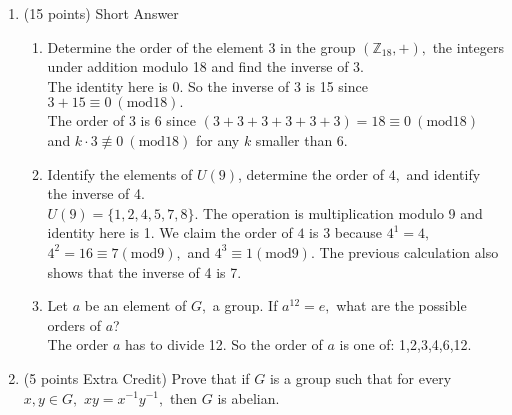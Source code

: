 \documentclass[12pt]{article}
\newcommand{\bbR}{\mathbb{R}}
\begin{document}
\begin{enumerate}
\begin{enumerate}
(Show $(X,\circ)$ is associative.) We know that the composition of functions is associative provided the operations is defined. \\

(Show there exists an identity.) Let $e=e(x)=x.$ Since $e$ is a bijection from $\bbR$ to $\bbR$ we know $e \in X.$ Let $f(x) \in X.$ Observe that $(f \circ e)(x)=f(e(x))=f(x)$ and $(e \circ f)(x)=e(f(x))=f(x).$ So $X$ has an identity.\\

(Show there exists an identity.) Let $f(x) \in X.$ Since $f(x)$ is a bijection from $\bbR$ to $\bbR$, we know it has an inverse, $f^{-1}(x)$ that is also a bijection from $\bbR$ to $\bbR.$ Thus, $f^{-1}(x) \in X.$\\
	\end{enumerate}
\newpage
\item (15 points) Short Answer
	\begin{enumerate}
	\item Determine the order of the element $3$ in the group $( \mathbb{Z}_{18}, +),$ the integers under addition modulo 18 and find the inverse of 3.\\
	The identity here is 0. So the inverse of 3 is 15 since $3+15 \equiv 0 \: (\text{mod} 18).$\\
	The order of 3 is 6 since $(3+3+3+3+3+3)=18\equiv 0 \: (\text{mod} 18)$ and $k\cdot 3 \not \equiv 0 \: (\text{mod} 18)$ for any $k$ smaller than 6.\\
	\item Identify the elements of $U(9)$, determine the order of $4,$ and identify the inverse of 4.\\
	$U(9)=\{1,2,4,5,7,8\}.$ The operation is multiplication modulo 9 and identity here is 1. We claim the order of $4$ is $3$ because $4^1=4,$ $4^2=16 \equiv 7 (\text{mod} 9),$ and $4^3 \equiv 1 (\text{mod} 9).$ The previous calculation also shows that the inverse of 4 is 7.\\
	
	\item Let $a$ be an element of $G,$ a group. If $a^{12}=e,$ what are the possible orders of $a$?\\
	
The order $a$ has to divide 12. So the order of $a$ is one of: 1,2,3,4,6,12.
	
	\end{enumerate}
	
\item (5 points Extra Credit) Prove that if $G$ is a group such that for every $x,y \in G,$ $xy=x^{-1}y^{-1},$ then $G$ is abelian.\\


\end{enumerate}
\end{document}
